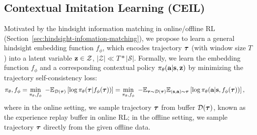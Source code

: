 
\subsection{Contextual Imitation Learning (CEIL)}
\label{sec:ceil-method}

Motivated by the hindsight information matching in online/offline RL (Section~\ref{sec:hindsight-infomation-matching}), we propose to learn a general hindsight embedding function ${f_\phi}$, which encodes trajectory ${\bm{\tau}}$ (with window size $T$) into a latent variable ${\mathbf{z}} \in \mathcal{Z}$, $|\mathcal{Z}| \ll T*|\mathcal{S}|$. 
Formally, we learn the embedding function ${f_\phi}$ and a corresponding contextual policy $\pi_\theta(\mathbf{a}|\mathbf{s},{\mathbf{z}})$ by minimizing the trajectory self-consistency loss: 
\begin{align}
	\pi_\theta, f_\phi &= \min_{\pi_\theta, f_\phi} \ - \mathbb{E}_{\mathcal{D}({\bm{\tau}})} \left[ \log \pi_\theta({\bm{\tau}}|{f_\phi}({\bm{\tau}})) \right] = \min_{\pi_\theta, f_\phi} \ - \mathbb{E}_{{\bm{\tau}}\sim\mathcal{D}({\bm{\tau}})}\mathbb{E}_{(\mathbf{s},\mathbf{a})\sim{\bm{\tau}}} \left[ \log \pi_\theta(\mathbf{a}|\mathbf{s}, {f_\phi}({\bm{\tau}})) \right], \label{eq:traj-self-consistent} 
\end{align}
where in the online setting, we sample trajectory ${\bm{\tau}}$ from buffer $\mathcal{D}({\bm{\tau}})$, known as the experience replay buffer in online RL; in the offline setting, we sample trajectory ${\bm{\tau}}$ directly from the given offline data. 

